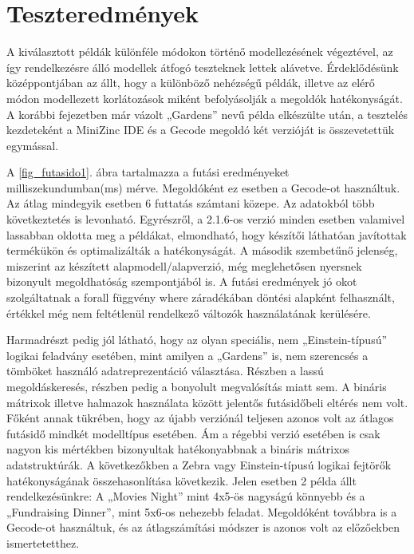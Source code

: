\documentclass[12pt,a4paper,twoside, openright]{report}
\begin{document}
\section{Teszteredmények}

    A kiválasztott példák különféle módokon történő modellezésének végeztével, az így rendelkezésre álló modellek átfogó teszteknek lettek alávetve.
    Érdeklődésünk középpontjában az állt, hogy a különböző nehézségű példák, illetve az elérő módon modellezett korlátozások miként befolyásolják a megoldók hatékonyságát.
    A korábbi fejezetben már vázolt „Gardens” nevű példa elkészülte után, a tesztelés kezdeteként a MiniZinc IDE és a Gecode megoldó két verzióját is összevetettük egymással.


    A \ref{fig_futasido1}. ábra tartalmazza a futási eredményeket milliszekundumban(ms) mérve.
    Megoldóként ez esetben a Gecode-ot használtuk.
    Az átlag mindegyik esetben 6 futtatás számtani közepe.
    Az adatokból több következtetés is levonható.
    Egyrészről, a 2.1.6-os verzió minden esetben valamivel lassabban oldotta meg a példákat, elmondható, hogy készítői láthatóan javítottak termékükön és optimalizálták a hatékonyságát.
    A második szembetűnő jelenség, miszerint az készített alapmodell/alapverzió, még meglehetősen nyersnek bizonyult megoldhatóság szempontjából is.
    A futási eredmények jó okot szolgáltatnak a forall függvény where záradékában döntési alapként felhasznált, értékkel még nem feltétlenül rendelkező változók használatának kerülésére.

    Harmadrészt pedig jól látható, hogy az olyan speciális, nem „Einstein-típusú” logikai feladvány esetében, mint amilyen a „Gardens” is, nem szerencsés a tömböket használó adatreprezentáció választása.
    Részben a lassú megoldáskeresés, részben pedig a bonyolult megvalósítás miatt sem.
    A bináris mátrixok illetve halmazok használata között jelentős futásidőbeli eltérés nem volt.
    Főként annak tükrében, hogy az újabb verziónál teljesen azonos volt az átlagos futásidő mindkét modelltípus esetében.
    Ám a régebbi verzió esetében is csak nagyon kis mértékben bizonyultak hatékonyabbnak a bináris mátrixos adatstruktúrák.
    A következőkben a Zebra vagy Einstein-típusú logikai fejtörők hatékonyságának 
    összehasonlítása következik.
    Jelen esetben 2 példa állt rendelkezésünkre: A „Movies 
    Night” mint 4x5-ös nagyságú könnyebb és a „Fundraising Dinner”, mint 5x6-os nehezebb 
    feladat.
    Megoldóként továbbra is a Gecode-ot használtuk, és az átlagszámítási módszer 
    is azonos volt az előzőekben ismertetetthez.
\end{document}
